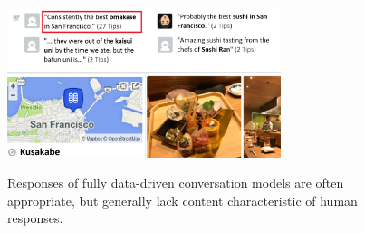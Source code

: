 \documentclass[letterpaper]{article}
\begin{document}
\begin{figure}
\centering
\includegraphics[width=8cm]{kusakabe}\\[0.2cm]
\begin{small}
\centering
{}
\end{small}
\caption{Responses of fully data-driven conversation models are often appropriate, but generally lack content characteristic of human responses.}
\label{fig:comp_sent}
\end{figure}
\end{document}
